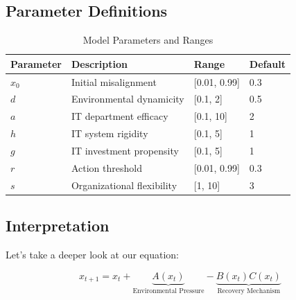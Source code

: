 \documentclass[a4paper, 10pt]{article}
\begin{document}
\subsection{Parameter Definitions}
\begin{table}[h]
	\centering
	\caption{Model Parameters and Ranges}
	\begin{tabular}{llll}
		\toprule
		\textbf{Parameter} & \textbf{Description}       & \textbf{Range} & \textbf{Default} \\
		\midrule
		$x_0$              & Initial misalignment       & [0.01, 0.99]   & 0.3              \\
		$d$                & Environmental dynamicity   & [0.1, 2]      & 0.5              \\
		$a$                & IT department efficacy     & [0.1, 10]      & 2                \\
		$h$                & IT system rigidity         & [0.1, 5]       & 1                \\
		$g$                & IT investment propensity   & [0.1, 5]       & 1                \\
		$r$                & Action threshold           & [0.01, 0.99]   & 0.3              \\
		$s$                & Organizational flexibility & [1, 10]        & 3                \\
		\bottomrule
	\end{tabular}
\end{table}

\subsection{Interpretation}
Let's take a deeper look at our equation:

\begin{equation}
	x_{t + 1} = x_t + \underbrace{A(x_t)}_{\text{Environmental Pressure}} - \underbrace{B(x_t)C(x_t)}_{\text{Recovery Mechanism}}
\end{equation}
\end{document}
